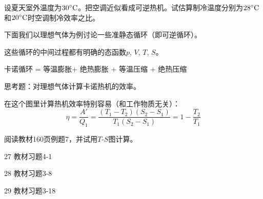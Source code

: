 \documentclass[CJK]{beamer}
\begin{document}
\begin{frame}
\bch
设夏天室外温度为$30^\circ \mathrm{C}$。把空调近似看成可逆热机。试估算制冷温度分别为$28^\circ \mathrm{C}$和$20^\circ \mathrm{C}$时空调制冷效率之比。
\ech
\end{frame}

\begin{frame}
\bch
下面我们以理想气体为例讨论一些准静态循环（即可逆循环）。

\skipline

这些循环的中间过程都有明确的态函数$p$, $V$, $T$, $S$。
\ech
\end{frame}

\begin{frame}
\bch
{}
\ech
\end{frame}

\begin{frame}
\bch
{}
\ech
\end{frame}


\begin{frame}
\bch
{}
\ech
\end{frame}

\begin{frame}
\bch
{}
\ech
\end{frame}


\begin{frame}
\bch
卡诺循环 = 等温膨胀+ 绝热膨胀 + 等温压缩 + 绝热压缩
\ech
\end{frame}

\begin{frame}
\bch
{}

思考题：对理想气体计算卡诺热机的效率。
\ech
\end{frame}

\begin{frame}
\bch
{}

在这个图里计算热机效率特别容易（和工作物质无关）：
$$\eta = \frac{A'}{Q_1} = \frac{(T_1-T_2)(S_2-S_1)}{T_1(S_2-S_1)} = 1- \frac{T_2}{T_1}$$

\ech
\end{frame}

\begin{frame}
\bch

阅读教材160页例题7，并试用$T$-$S$图计算。

\ech
\end{frame}


\begin{frame}
\bch
\bitem
\item[27]{教材习题4-1}
\item[28]{教材习题3-8}
\item[29]{教材习题3-18}
\eitem

\ech
\end{frame}
\end{document}

